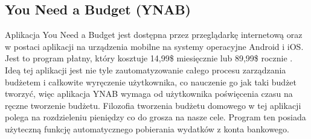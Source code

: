 \documentclass[shortabstract,inz]{iithesis}
\begin{document}
\subsection{You Need a Budget (YNAB)}
Aplikacja You Need a Budget \citep{ynab} jest dostępna przez przeglądarkę internetową oraz w postaci aplikacji na urządzenia mobilne na systemy operacyjne Android i iOS. Jest to program płatny, który kosztuje 14,99\$ miesięcznie lub 89,99\$ rocznie \cite{ynab-price}. Ideą tej aplikacji jest nie tyle zautomatyzowanie całego procesu zarządzania budżetem i całkowite wyręczenie użytkownika, co nauczenie go jak taki budżet tworzyć, więc aplikacja YNAB wymaga od użytkownika poświęcenia czasu na ręczne tworzenie budżetu. Filozofia tworzenia budżetu domowego w tej aplikacji polega na rozdzieleniu pieniędzy co do grosza na nasze cele. Program ten posiada użyteczną funkcję automatycznego pobierania wydatków z konta bankowego.
\end{document}
